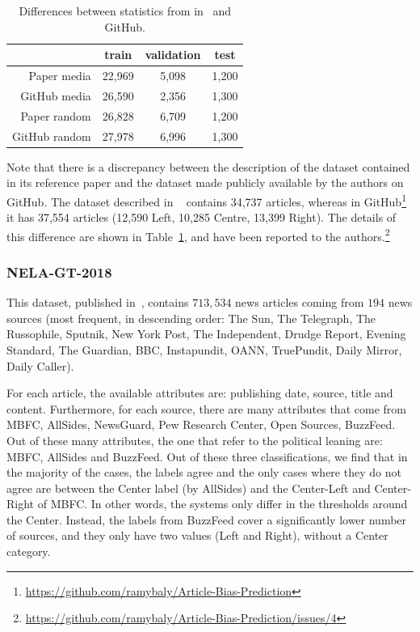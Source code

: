 \begin{table}[!htbp]
   \centering
   \begin{tabular}{r|c|c|c}
       & train & validation & test \\
       \hline
       Paper media & 22,969 & 5,098 & 1,200 \\
       GitHub media & 26,590 & 2,356 & 1,300 \\
       \hline
       Paper random & 26,828 & 6,709 & 1,200 \\
       GitHub random & 27,978 & 6,996 & 1,300
   \end{tabular}
   \caption{Differences between statistics from in~\citet{baly2020we} and GitHub.}
   \label{tab:baly_size}
\end{table}

Note that there is a discrepancy between the description of the dataset contained in its reference paper and the dataset made publicly available by the authors on GitHub.
The dataset described in ~\citet{baly2020we} contains 34,737 articles, whereas in GitHub\footnote{\url{https://github.com/ramybaly/Article-Bias-Prediction}} it has 37,554 articles (12,590 Left, 10,285 Centre, 13,399 Right). The details of this difference are shown in Table~\ref{tab:baly_size}, and have been reported to the authors.\footnote{\url{https://github.com/ramybaly/Article-Bias-Prediction/issues/4}}

\subsubsection{NELA-GT-2018}

This dataset, published in~\citet{DVN/ULHLCB_2019}, contains $713,534$ news articles coming from $194$ news sources (most frequent, in descending order: The Sun, The Telegraph, The Russophile, Sputnik, New York Post, The Independent, Drudge Report, Evening Standard, The Guardian, BBC, Instapundit, OANN, TruePundit, Daily Mirror, Daily Caller).

For each article, the available attributes are: publishing date, source, title and content.
Furthermore, for each source, there are many attributes that come from MBFC, AllSides, NewsGuard, Pew Research Center, Open Sources, BuzzFeed. Out of these many attributes, the one that refer to the political leaning are: MBFC, AllSides and BuzzFeed. Out of these three classifications, we find that in the majority of the cases, the labels agree and the only cases where they do not agree are between the Center label (by AllSides) and the Center-Left and Center-Right of MBFC. In other words, the systems only differ in the thresholds around the Center.
Instead, the labels from BuzzFeed cover a significantly lower number of sources, and they only have two values (Left and Right), without a Center category.

